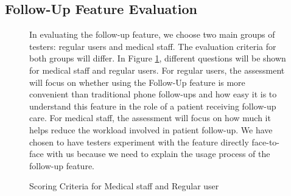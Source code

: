 \documentclass[12pt,oneside,openright,a4paper]{cpe-english-project}
\begin{document}
      \subsection{Follow-Up Feature Evaluation}
        \begin{figure}[H]
          \centering
          \begin{minipage}{0.3\textwidth}
            \centering
          \end{minipage}
          \begin{minipage}{0.3\textwidth}
            \centering
          \end{minipage}
          \caption{Scoring Criteria for Medical staff and Regular user}\label{fig:Medandnormalquestion}
            \begin{justify}
              \qquad In evaluating the follow-up feature, we choose two main groups of testers: regular users and medical staff. The evaluation criteria for both groups will differ. In Figure \ref{fig:Medandnormalquestion}, different questions will be shown for medical staff and regular users. For regular users, the assessment will focus on whether using the Follow-Up feature is more convenient than traditional phone follow-ups and how easy it is to understand this feature in the role of a patient receiving follow-up care. For medical staff, the assessment will focus on how much it helps reduce the workload involved in patient follow-up. We have chosen to have testers experiment with the feature directly face-to-face with us because we need to explain the usage process of the follow-up feature.\par            
            \end{justify}
        \end{figure}
\end{document}
